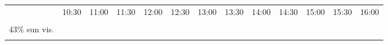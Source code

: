 \begin{figure}[!ht]
    \centering
    \setlength{\tabcolsep}{0pt}
    \newcommand{\customwidth}{.08\linewidth}
    \begin{tabular}{@{}rcccccccccccc@{}}
    &
    \begin{minipage}{\customwidth}\centering\scriptsize 10:30 \end{minipage} &
    \begin{minipage}{\customwidth}\centering\scriptsize 11:00 \end{minipage} &
    \begin{minipage}{\customwidth}\centering\scriptsize 11:30 \end{minipage} &
    \begin{minipage}{\customwidth}\centering\scriptsize 12:00 \end{minipage} &
    \begin{minipage}{\customwidth}\centering\scriptsize 12:30 \end{minipage} &
    \begin{minipage}{\customwidth}\centering\scriptsize 13:00 \end{minipage} &
    \begin{minipage}{\customwidth}\centering\scriptsize 13:30 \end{minipage} &
    \begin{minipage}{\customwidth}\centering\scriptsize 14:00 \end{minipage} &
    \begin{minipage}{\customwidth}\centering\scriptsize 14:30 \end{minipage} &
    \begin{minipage}{\customwidth}\centering\scriptsize 15:00 \end{minipage} &
    \begin{minipage}{\customwidth}\centering\scriptsize 15:30 \end{minipage} &
    \begin{minipage}{\customwidth}\centering\scriptsize 16:00 \end{minipage}
    \\
    \begin{sideways}\begin{minipage}{\customwidth}\centering \scriptsize illumination \\ 43\% sun vis. \\ \vspace{5pt} \end{minipage}\end{sideways} &

\end{tabular}
\end{figure}
